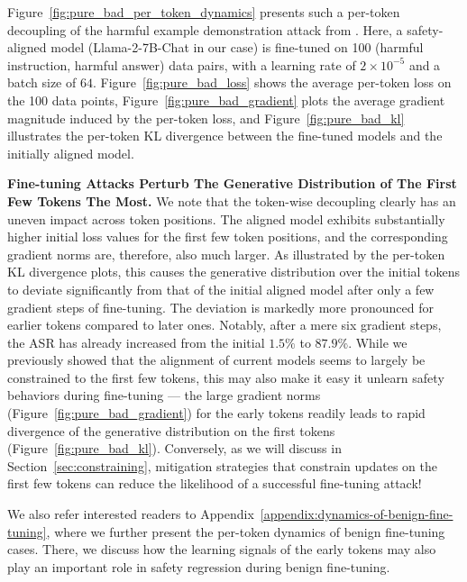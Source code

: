 Figure~\ref{fig:pure_bad_per_token_dynamics} presents such a per-token decoupling of the harmful example demonstration attack from \citet{qi2023fine}. Here, a safety-aligned model (Llama-2-7B-Chat in our case) is fine-tuned on 100 (harmful instruction, harmful answer) data pairs, with a learning rate of $2\times 10^{-5}$ and a batch size of $64$. Figure~\ref{fig:pure_bad_loss} shows the average per-token loss on the 100 data points, Figure~\ref{fig:pure_bad_gradient} plots the average gradient magnitude induced by the per-token loss, and Figure~\ref{fig:pure_bad_kl} illustrates the per-token KL divergence between the fine-tuned models and the initially aligned model.


 

 
 

\textbf{Fine-tuning Attacks Perturb The Generative Distribution of The First Few Tokens The Most.} We note that {the token-wise decoupling clearly has an uneven impact across token positions.} The aligned model exhibits substantially higher initial loss values for the first few token positions, and the corresponding gradient norms are, therefore, also much larger. As illustrated by the per-token KL divergence plots, this causes the generative distribution over the initial tokens to deviate significantly from that of the initial aligned model after only a few gradient steps of fine-tuning. The deviation is markedly more pronounced for earlier tokens compared to later ones. Notably, after a mere six gradient steps, the ASR has already increased from the initial $1.5\%$ to $87.9\%$. 
While we previously showed that the  alignment of current models seems to largely be constrained to the first few tokens, this may also make it easy it unlearn safety behaviors during fine-tuning
--- the large gradient norms (Figure~\ref{fig:pure_bad_gradient}) for the early tokens readily leads to rapid divergence of the generative distribution on the first tokens (Figure~\ref{fig:pure_bad_kl}). Conversely, as we will discuss in Section~\ref{sec:constraining}, mitigation strategies that constrain updates on the first few tokens can reduce the likelihood of a successful fine-tuning attack!

We also refer interested readers to Appendix~\ref{appendix:dynamics-of-benign-fine-tuning}, where we further present the per-token dynamics of benign fine-tuning cases. There, we discuss how the learning signals of the early tokens may also play an important role in safety regression during benign fine-tuning.


